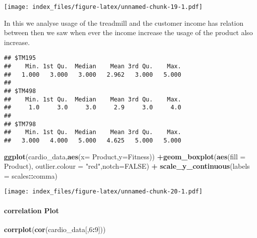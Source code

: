 \documentclass[
]{article}
\newenvironment{Shaded}{\begin{snugshade}}{\end{snugshade}}
\newcommand{\DataTypeTok}[1]{\textcolor[rgb]{0.13,0.29,0.53}{#1}}
\newcommand{\DecValTok}[1]{\textcolor[rgb]{0.00,0.00,0.81}{#1}}
\newcommand{\KeywordTok}[1]{\textcolor[rgb]{0.13,0.29,0.53}{\textbf{#1}}}
\newcommand{\NormalTok}[1]{#1}
\newcommand{\OperatorTok}[1]{\textcolor[rgb]{0.81,0.36,0.00}{\textbf{#1}}}
\newcommand{\OtherTok}[1]{\textcolor[rgb]{0.56,0.35,0.01}{#1}}
\newcommand{\StringTok}[1]{\textcolor[rgb]{0.31,0.60,0.02}{#1}}
\begin{document}
\texttt{[image: index\_files/figure-latex/unnamed-chunk-19-1.pdf]}

In this we analyse usage of the treadmill and the customer income has
relation between then we saw when ever the income increase the usage of
the product also increase.

\begin{Shaded}
\end{Shaded}

\begin{verbatim}
## $TM195
##    Min. 1st Qu.  Median    Mean 3rd Qu.    Max. 
##   1.000   3.000   3.000   2.962   3.000   5.000 
## 
## $TM498
##    Min. 1st Qu.  Median    Mean 3rd Qu.    Max. 
##     1.0     3.0     3.0     2.9     3.0     4.0 
## 
## $TM798
##    Min. 1st Qu.  Median    Mean 3rd Qu.    Max. 
##   3.000   4.000   5.000   4.625   5.000   5.000
\end{verbatim}

\begin{Shaded}
\begin{Highlighting}[]
\KeywordTok{ggplot}\NormalTok{(cardio_data,}\KeywordTok{aes}\NormalTok{(}\DataTypeTok{x=}\NormalTok{ Product,}\DataTypeTok{y=}\NormalTok{Fitness)) }\OperatorTok{+}\KeywordTok{geom_boxplot}\NormalTok{(}\KeywordTok{aes}\NormalTok{(}\DataTypeTok{fill =}\NormalTok{ Product), }\DataTypeTok{outlier.colour =} \StringTok{"red"}\NormalTok{,}\DataTypeTok{notch=}\OtherTok{FALSE}\NormalTok{) }\OperatorTok{+}\StringTok{ }\KeywordTok{scale_y_continuous}\NormalTok{(}\DataTypeTok{labels =}\NormalTok{ scales}\OperatorTok{::}\NormalTok{comma)}
\end{Highlighting}
\end{Shaded}

\texttt{[image: index\_files/figure-latex/unnamed-chunk-20-1.pdf]}

\hypertarget{correlation-plot}{%
\paragraph{correlation Plot}\label{correlation-plot}}

\begin{Shaded}
\begin{Highlighting}[]
\KeywordTok{corrplot}\NormalTok{(}\KeywordTok{cor}\NormalTok{(cardio_data[,}\DecValTok{6}\OperatorTok{:}\DecValTok{9}\NormalTok{]))}
\end{Highlighting}
\end{Shaded}
\end{document}
